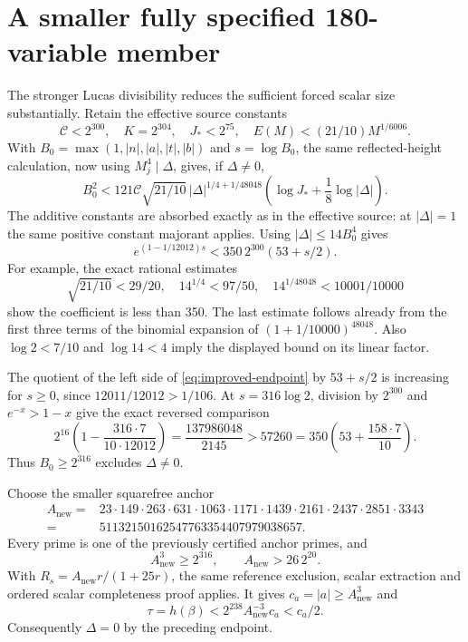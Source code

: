 \documentclass[11pt]{article}
\theoremstyle{remark}\newtheorem{remark}[theorem]{Remark}
\begin{document}
\section{A smaller fully specified 180-variable member}
The stronger Lucas divisibility reduces the sufficient forced scalar
size substantially. Retain the effective source constants
\[
 \mathcal C<2^{300},\quad K=2^{304},\quad J_*<2^{75},
 \quad E(M)<(21/10)M^{1/6006}.
\]
With $B_0=\max(1,|n|,|a|,|t|,|b|)$ and $s=\log B_0$, the
same reflected-height calculation, now using $M_j^4\mid\Delta$,
gives, if $\Delta\ne0$,
\[
 B_0^2<121\mathcal C\sqrt{21/10}\,
 |\Delta|^{1/4+1/48048}
 \left(\log J_*+\frac18\log|\Delta|\right).
\]
The additive constants are absorbed exactly as in the effective
source: at $|\Delta|=1$ the same positive constant majorant applies.
Using $|\Delta|\le14B_0^4$ gives
\begin{equation}\label{eq:improved-endpoint}
 e^{(1-1/12012)s}<350\,2^{300}(53+s/2).
\end{equation}
For example, the exact rational estimates
\[
 \sqrt{21/10}<29/20,\quad 14^{1/4}<97/50,
 \quad 14^{1/48048}<10001/10000
\]
show the coefficient is less than 350. The last estimate follows
already from the first three terms of the binomial expansion of
$(1+1/10000)^{48048}$. Also $\log2<7/10$ and $\log14<4$ imply
the displayed bound on its linear factor.

The quotient of the left side of
\eqref{eq:improved-endpoint} by $53+s/2$ is increasing for $s\ge0$,
since $12011/12012>1/106$. At $s=316\log2$, division by $2^{300}$
and $e^{-x}>1-x$ give the exact reversed comparison
\[
 2^{16}\left(1-\frac{316\cdot7}{10\cdot12012}\right)
 =\frac{137986048}{2145}
 >57260
 =350\left(53+\frac{158\cdot7}{10}\right).
\]
Thus $B_0\ge2^{316}$ excludes $\Delta\ne0$.

Choose the smaller squarefree anchor
\[
\begin{split}
 A_\mathrm{new}={}&23\cdot149\cdot263\cdot631\cdot1063\cdot1171
 \cdot1439\cdot2161\cdot2437\cdot2851\cdot3343\\
 ={}&51132150162547763354407979038657.
\end{split}
\]
Every prime is one of the previously certified anchor primes, and
\[
 A_\mathrm{new}^3\ge2^{316},\qquad A_\mathrm{new}>26\,2^{20}.
\]
With $R_s=A_\mathrm{new}r/(1+25r)$, the same reference exclusion,
scalar extraction and ordered scalar completeness proof applies.
It gives $c_a=|a|\ge A_\mathrm{new}^3$ and
\[
 \tau=h(\beta)<2^{238}A_\mathrm{new}^{-3}c_a<c_a/2.
\]
Consequently $\Delta=0$ by the preceding endpoint.
\end{document}
